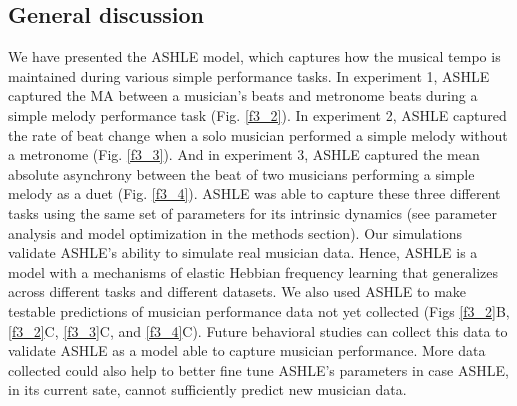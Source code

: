 \documentclass{report}
\begin{document}
\subsection{General discussion}

We have presented the ASHLE model, which captures how the musical tempo is maintained during various simple performance tasks. In experiment 1, ASHLE captured the MA between a musician's beats and metronome beats during a simple melody performance task (Fig.{} \ref{f3_2}). In experiment 2, ASHLE captured the rate of beat change when a solo musician performed a simple melody without a metronome (Fig.{} \ref{f3_3}). And in experiment 3, ASHLE captured the mean absolute asynchrony between the beat of two musicians performing a simple melody as a duet (Fig.{} \ref{f3_4}). ASHLE was able to capture these three different tasks using the same set of parameters for its intrinsic dynamics (see parameter analysis and model optimization in the methods section). Our simulations validate ASHLE's ability to simulate real musician data. Hence, ASHLE is a model with a mechanisms of elastic Hebbian frequency learning that generalizes across different tasks and different datasets. We also used ASHLE to make testable predictions of musician performance data not yet collected (Figs \ref{f3_2}B, \ref{f3_2}C, \ref{f3_3}C, and \ref{f3_4}C). Future behavioral studies can collect this data to validate ASHLE as a model able to capture musician performance. More data collected could also help to better fine tune ASHLE's parameters in case ASHLE, in its current sate, cannot sufficiently predict new musician data.
\end{document}
